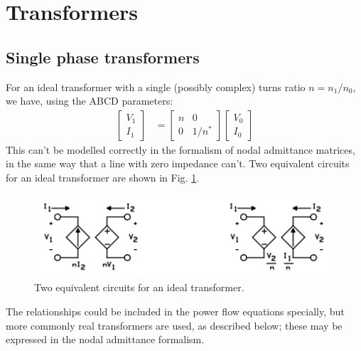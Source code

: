 \documentclass[11pt]{article}
\begin{document}
\section{Transformers}
\subsection{Single phase transformers}
For an ideal transformer with a single (possibly complex) turns ratio $n = n_1/n_0$, we have, using the ABCD parameters:
\begin{align}
\begin{bmatrix}V_1 \\ I_1\end{bmatrix} &= \begin{bmatrix}n & 0 \\ 0 & 1/n^*\end{bmatrix}\begin{bmatrix}V_0 \\ I_0 \end{bmatrix}
\end{align}
This can't be modelled correctly in the formalism of nodal admittance matrices, in the same way that a line with zero impedance can't. Two equivalent circuits for an ideal transformer are shown in Fig. \ref{FIG_IDEAL_TRANS_EQUIV}.
\begin{figure}[!h]
	\begin{center}
		\includegraphics[width=(\textwidth-2cm)]{ideal_transformer_equiv.png}
	\end{center}
	\caption{
		Two equivalent circuits for an ideal transformer.
	}
	\label{FIG_IDEAL_TRANS_EQUIV}
\end{figure}
The relationships could be included in the power flow equations specially, but more commonly real transformers are used, as described below; these may be expressed in the nodal admittance formalism.
\end{document}
